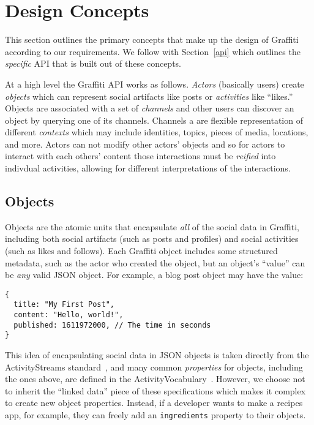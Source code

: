 \section{Design Concepts}
\label{concepts}

This section outlines the primary concepts that make up the design of Graffiti
according to our requirements.
We follow with Section~\ref{api} which outlines the \emph{specific} API that is built out of these
concepts.

At a high level the Graffiti API works as follows.
\emph{Actors} (basically users) create \emph{objects} which can represent
social artifacts like posts or \emph{activities} like ``likes.''
Objects are associated with a set of \emph{channels} and other users can
discover an object by querying one of its channels. Channels a are flexible representation
of different \emph{contexts} which may include identities, topics, pieces of media, locations,
and more.
Actors can not modify other actors' objects and so for actors to interact with each others' content
those interactions must be \emph{reified} into indivdual activities,
allowing for different interpretations of the interactions.

\subsection{Objects}
\label{concepts:objects}

Objects are the atomic units that encapsulate \emph{all}
of the social data in Graffiti, including
both social artifacts (such as posts and profiles) and social activities (such as likes and follows).
Each Graffiti object includes some structured metadata,
such as the actor who created the object,
but an object's ``value'' can be \emph{any} valid JSON object.
For example, a blog post object may have the value:

\begin{verbatim}
{
  title: "My First Post",
  content: "Hello, world!",
  published: 1611972000, // The time in seconds
}
\end{verbatim}

This idea of encapsulating social data in JSON objects is
taken directly from the ActivityStreams standard~\cite{activitystreams},
and many common \emph{properties} for objects,
including the ones above, are defined in the
ActivityVocabulary~\cite{activityvocab}.
However, we choose not to inherit the ``linked data'' piece
of these specifications which makes it complex to create new object properties.
Instead, if a developer wants to make a recipes app, for example,
they can freely add an \texttt{ingredients} property to their objects.

